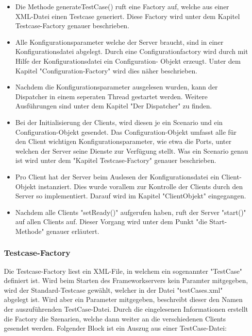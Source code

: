 \begin{itemize}
\item Die Methode generateTestCase() ruft eine Factory auf, welche aus einer XML-Datei einen Testcase generiert. Diese Factory wird unter dem Ka\-pi\-tel Testcase-Factory genauer be\-schrie\-ben.
\item Alle Konfigurationsparameter welche der Server braucht, sind in einer Konfigurations\-datei ab\-ge\-legt. Durch eine Configurationfactory wird durch mit Hilfe der Konfig\-urationsdatei ein Configuration- Objekt er\-zeugt. Unter dem Kapi\-tel "Configuration-Factory" wird dies näher beschrieben.
\item Nachdem die Konfigurationsparameter ausgelesen wurden, kann der Dis\-patcher in einem seper\-aten Thread ge\-startet werden. Weitere Aus\-füh\-run\-gen sind unter dem Kapitel "Der Dispatcher" zu finden.
\item Bei der Initialisierung der Clients, wird diesen je ein Scenario und ein Configuration-Objekt gesendet. Das Configuration-Objekt umfasst alle für den Client wichtigen Konfigurationsparameter, wie etwa die Ports, unter welchen der Server seine Dienste zur Verfügung stellt. Was ein Scenario genau ist wird unter dem "Kapitel Testcase-Factory" genauer beschrieben.
\item Pro Client hat der Server beim Auslesen der Konfigurationsdatei ein Client-Objekt instanziert. Dies wurde voral\-lem zur Kon\-trol\-le der Cli\-ents durch den Server so implementiert. Darauf wird im Kapitel "ClientObjekt" eingegangen.
\item Nachdem alle Clients "setReady()" aufgerufen haben, ruft der Server "start()" auf allen Clients auf. Dieser Vorgang wird unter dem Punkt "die Start-Methode" genauer erläutert.
\end{itemize}

\subsubsection{Testcase-Factory}
\label{sec:testCaseFactory}
Die Testcase-Factory liest ein XML-File, in welchem ein sogenannter "TestCase" definiert ist. Wird beim Starten des Frameworkservers kein Paramter mitgegeben, wird der Standard-Testcase gewählt, welcher in der Datei "testCases.xml" abgelegt ist. Wird aber ein Parameter mitgegeben, beschreibt dieser den Namen der auszuführenden TestCase-Datei.\newline
Durch die ein\-ge\-lesenen In\-for\-ma\-tio\-nen er\-stellt die Fac\-tory die Szena\-rien, wel\-che dann wei\-ter an die ver\-schie\-denen Clients ge\-sendet werden. Folgender Block ist ein Auszug aus einer TestCase-Datei:

